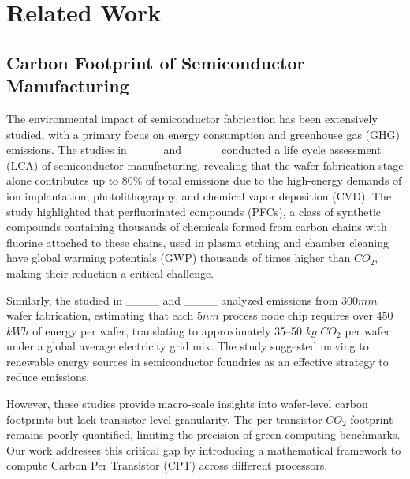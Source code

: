 \section{Related Work}
\subsection{Carbon Footprint of Semiconductor Manufacturing}
The environmental impact of semiconductor fabrication has been extensively studied, with a primary focus on energy consumption and greenhouse gas (GHG) emissions. The studies in____ and ____ conducted a life cycle assessment (LCA) of semiconductor manufacturing, revealing that the wafer fabrication stage alone contributes up to 80\% of total emissions due to the high-energy demands of ion implantation, photolithography, and chemical vapor deposition (CVD). The study highlighted that perfluorinated compounds (PFCs), a class of synthetic compounds containing thousands of chemicals formed from carbon chains with fluorine attached to these chains, used in plasma etching and chamber cleaning have global warming potentials (GWP) thousands of times higher than $CO_2$, making their reduction a critical challenge.

Similarly, the studied in ____ and ____ analyzed emissions from 300$mm$ wafer fabrication, estimating that each 5$nm$ process node chip requires over 450 $kWh$ of energy per wafer, translating to approximately 35–50 $kg$ $CO_2$ per wafer under a global average electricity grid mix. The study suggested moving to renewable energy sources in semiconductor foundries as an effective strategy to reduce emissions.

However, these studies provide macro-scale insights into wafer-level carbon footprints but lack transistor-level granularity. The per-transistor $CO_2$ footprint remains poorly quantified, limiting the precision of green computing benchmarks. Our work addresses this critical gap by introducing a mathematical framework to compute Carbon Per Transistor (CPT) across different processors.

